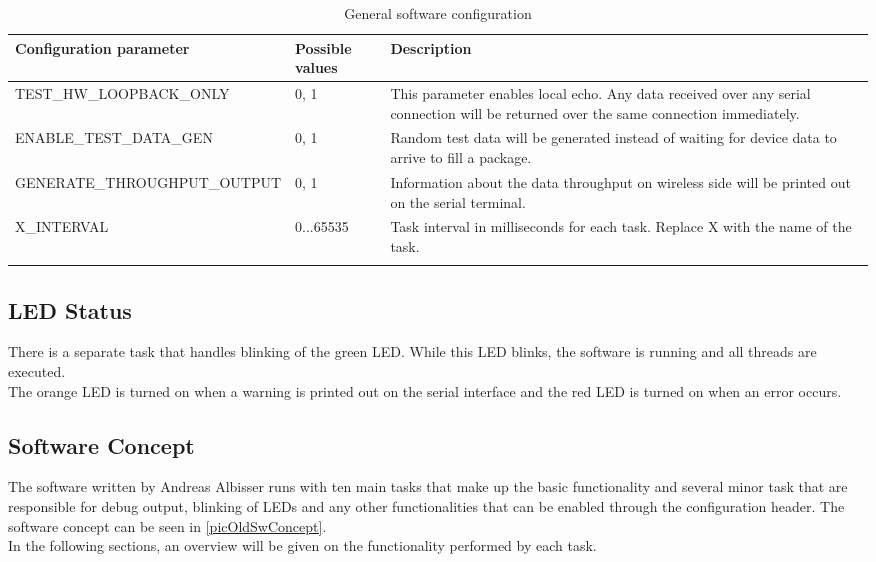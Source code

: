 \begin{center}
    \begin{longtable}{p{4cm}p{2cm}p{8cm}}
        \hline
        \textbf{Configuration parameter} & \textbf{Possible values} & \textbf{Description} \\
        \hline
        TEST\_HW\_LOOPBACK\_ONLY & 0, 1 & 
        This parameter enables local echo. Any data received over any serial connection will be returned over the same connection immediately.\\
        \hline
        ENABLE\_TEST\_DATA\_GEN &  0, 1 & 
        Random test data will be generated instead of waiting for device data to arrive to fill a package.\\
        \hline
        GENERATE\_THROUGHPUT\_OUTPUT &  0, 1 & 
        Information about the data throughput on wireless side will be printed out on the serial terminal.\\
        \hline
        X\_INTERVAL &  0...65535 & 
        Task interval in milliseconds for each task. Replace X with the name of the task. \\
        \hline
        \caption{General software configuration}
        \label{Specific config arduino}    
    \end{longtable}
\end{center}
%
%
\subsection{LED Status}
There is a separate task that handles blinking of the green LED. While this LED blinks, the software is running and all threads are executed.\\
The orange LED is turned on when a warning is printed out on the serial interface and the red LED is turned on when an error occurs.\\
%
\subsection{Software Concept}
The software written by Andreas Albisser runs with ten main tasks that make up the basic functionality and several minor task that are responsible for debug output, blinking of LEDs and any other functionalities that can be enabled through the configuration header. The software concept can be seen in \autoref{picOldSwConcept}. \\
%
In the following sections, an overview will be given on the functionality performed by each task.
